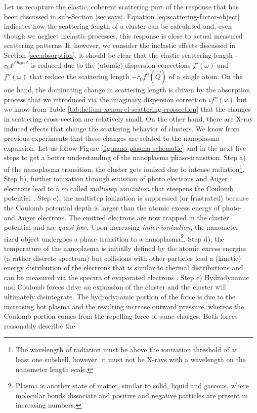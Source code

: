  Let us recapture the elastic, coherent scattering part of the response that has been discussed in sub-Section \ref{sec:saxs}. Equation \eqref{eq:scattering-factor-object} indicates how the scattering length of a cluster can be calculated and, even though we neglect inelastic processes, this response is close to actual measured scattering patterns. If, however, we consider the inelastic effects discussed in Section \ref{sec:absorption}, it should be clear that the elastic scattering length -$r_{0}F^{Object}$ is reduced due to the (atomic) dispersion corrections $f'\left(\omega\right)$ and $f''\left(\omega\right)$ that reduce the scattering length $-r_{0}f^{0}\left(\vec{Q}\right)$ of a single atom. On the one hand, the dominating change in scattering length is driven by the absorption process that we introduced via the imaginary dispersion correction $i f''\left(\omega\right)$ but we know from Table \ref{tab:helium-xenon-el-scattering-crossection} that the changes in scattering cross-section are relatively small. On the other hand, there are X-ray induced effects that change the scattering behavior of clusters. We know from previous experiments \citep{Gorkhover-2016-NatPho} that these changes are related to the nanoplasma expansion. Let us follow Figure \ref{fig:nano-plasma-schematic} and \citep{Arbeiter-2011-NJP,Bostedt-2010-JPB} in the next five steps to get a better understanding of the nanoplasma phase-transition. Step a) of the nanoplasma transition, the cluster gets ionized due to intense radiation\footnote{The wavelength of radiation must be above the ionization threshold of at least one subshell, however, it must not be X-rays with a wavelength on the nanometer length scale.}. Step b), further ionization through emission of photo electrons and Auger electrons lead to a so called \textit{multistep ionization} that steepens the Coulomb potential \citep{Wabnitz-2002-Nature,Laarmann-2004-PRL,Bostedt-2008-PRL}. Step c), the multistep ionization is suppressed (or frustrated) because the Coulomb potential depth is larger than the atomic excess energy of photo- and Auger electrons. The emitted electrons are now trapped in the cluster potential and are \textit{quasi-free}. Upon increasing \textit{inner ionization}, the nanometer sized object undergoes a phase transition to a nanoplasma\footnote{Plasma is another state of matter, similar to solid, liquid and gaseous, where molecular bonds dissociate and positive and negative particles are present in increasing numbers.}. Step d), the temperature of the nanoplasma is initially defined by the atomic excess energies (a rather discrete spectrum) but collisions with other particles lead a (kinetic) energy distribution of the electrons that is similar to thermal distributions and can be measured via the spectra of evaporated electrons \citep{Laarmann-2005-PRL,Bostedt-2010-NJP}. Step e) Hydrodynamic and Coulomb forces drive an expansion of the cluster and the cluster will ultimately disintegrate. The hydrodynamic portion of the force is due to the increasing hot plasma and the resulting increase outward pressure, whereas the Coulomb portion comes from the repelling force of same charges. Both forces reasonably describe the 